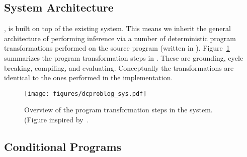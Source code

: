 












\subsection{\dcproblogsty System Architecture}
\label{sec:architecture}

\dcproblogsys, is built on top of the existing \problogsys system. This means we inherit the general architecture of performing inference via a number of deterministic program transformations performed on the source program (written in \dcproblogsty). Figure~\ref{figure:dcproblog_sys} summarizes the program transformation steps in \dcproblogsys. These are grounding, cycle breaking, compiling, and evaluating. Conceptually the transformations are identical to the ones performed in the \problogsys implementation.

\begin{figure}[h]
	\centering
	\texttt{[image: figures/dcproblog\_sys.pdf]}
	\caption[Overview of the program transformation steps in the \dcproblogsys system]{Overview of the program transformation steps in the \dcproblogsys system. (Figure inspired by~\protect\citep[Figure 2]{zuidbergdosmartires2019transforming}.}
	\label{figure:dcproblog_sys}
\end{figure}

\subsection{Conditional \dcproblogsty Programs}

